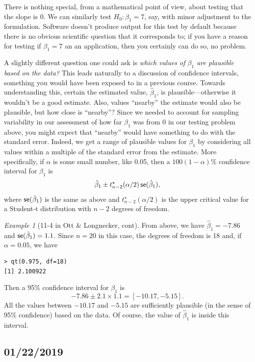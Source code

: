 \documentclass[a4paper, 12pt]{article}
\theoremstyle{plain}
\theoremstyle{definition}
\theoremstyle{remark}
\newtheorem*{example}{Example}
\begin{document}
There is nothing special, from a mathematical point of view, about testing that the slope is 0.  We can similarly test $H_0: \beta_1 = 7$, say, with minor adjustment to the formulation.  Software doesn't produce output for this test by default because there is no obvious scientific question that it corresponds to; if you have a reason for testing if $\beta_1=7$ an an application, then you certainly can do so, no problem.  

A slightly different question one could ask is {\em which values of $\beta_1$ are plausible based on the data?}  This leads naturally to a discussion of confidence intervals, something you would have been exposed to in a previous course.  Towards understanding this, certain the estimated value, $\hat\beta_1$, is plausible---otherwise it wouldn't be a good estimate.  Also, values ``nearby'' the estimate would also be plausible, but how close is ``nearby''?  Since we needed to account for sampling variability in our assessment of how far $\hat\beta_1$ was from 0 in our testing problem above, you might expect that ``nearby'' would have something to do with the standard error.  Indeed, we get a range of plausible values for $\beta_1$ by considering all values within a multiple of the standard error from the estimate.  More specifically, if $\alpha$ is some small number, like 0.05, then a $100(1-\alpha)$\% confidence interval for $\beta_1$ is 
\[ \hat\beta_1 \pm t_{n-2}^\star(\alpha/2) \, {\sf se}(\hat\beta_1), \]
where ${\sf se}(\hat\beta_1)$ is the same as above and $t_{n-2}^\star(\alpha/2)$ is the upper critical value for a Student-t distribution with $n-2$ degrees of freedom.  

\begin{example}[11-4 in Ott \& Longnecker, cont]
From above, we have $\hat\beta_1=-7.86$ and ${\sf se}(\hat\beta_1) = 1.1$.  Since $n=20$ in this case, the degrees of freedom is 18 and, if $\alpha=0.05$, we have 
{\small
\begin{verbatim}
> qt(0.975, df=18)
[1] 2.100922
\end{verbatim}
}
\noindent Then a 95\% confidence interval for $\beta_1$ is 
\[ -7.86 \pm 2.1 \times 1.1 = [-10.17, -5.15]. \]
All the values between $-10.17$ and $-5.15$ are sufficiently plausible (in the sense of 95\% confidence) based on the data.  Of course, the value of $\hat\beta_1$ is inside this interval.  
\end{example}


\subsection*{01/22/2019}
\end{document}
